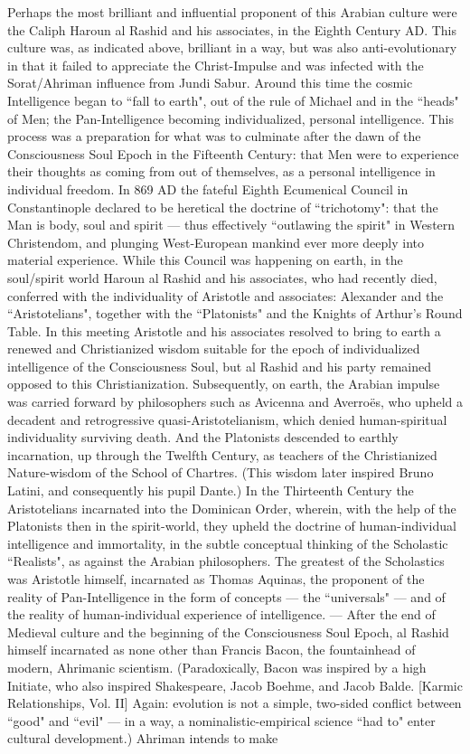 \begin{quotex}
Perhaps the most brilliant and influential proponent of this Arabian culture were the Caliph Haroun al Rashid and his associates, in the Eighth Century AD. This culture was, as indicated above, brilliant in a way, but was also anti-evolutionary in that it failed to appreciate the Christ-Impulse and was infected with the Sorat/Ahriman influence from Jundi Sabur. Around this time the cosmic Intelligence began to ``fall to earth", out of the rule of Michael and in the ``heads" of Men; the Pan-Intelligence becoming individualized, personal intelligence. This process was a preparation for what was to culminate after the dawn of the Consciousness Soul Epoch in the Fifteenth Century: that Men were to experience their thoughts as coming from out of themselves, as a personal intelligence in individual freedom. In 869 AD the fateful Eighth Ecumenical Council in Constantinople declared to be heretical the doctrine of ``trichotomy": that the Man is body, soul and spirit — thus effectively ``outlawing the spirit" in Western Christendom, and plunging West-European mankind ever more deeply into material experience. While this Council was happening on earth, in the soul/spirit world Haroun al Rashid and his associates, who had recently died, conferred with the individuality of Aristotle and associates: Alexander and the ``Aristotelians", together with the ``Platonists" and the Knights of Arthur's Round Table. In this meeting Aristotle and his associates resolved to bring to earth a renewed and Christianized wisdom suitable for the epoch of individualized intelligence of the Consciousness Soul, but al Rashid and his party remained opposed to this Christianization. Subsequently, on earth, the Arabian impulse was carried forward by philosophers such as Avicenna and Averroës, who upheld a decadent and retrogressive quasi-Aristotelianism, which denied human-spiritual individuality surviving death. And the Platonists descended to earthly incarnation, up through the Twelfth Century, as teachers of the Christianized Nature-wisdom of the School of Chartres. (This wisdom later inspired Bruno Latini, and consequently his pupil Dante.) In the Thirteenth Century the Aristotelians incarnated into the Dominican Order, wherein, with the help of the Platonists then in the spirit-world, they upheld the doctrine of human-individual intelligence and immortality, in the subtle conceptual thinking of the Scholastic ``Realists", as against the Arabian philosophers. The greatest of the Scholastics was Aristotle himself, incarnated as Thomas Aquinas, the proponent of the reality of Pan-Intelligence in the form of concepts — the ``universals" — and of the reality of human-individual experience of intelligence. — After the end of Medieval culture and the beginning of the Consciousness Soul Epoch, al Rashid himself incarnated as none other than Francis Bacon, the fountainhead of modern, Ahrimanic scientism. (Paradoxically, Bacon was inspired by a high Initiate, who also inspired Shakespeare, Jacob Boehme, and Jacob Balde. [Karmic Relationships, Vol. II] Again: evolution is not a simple, two-sided conflict between ``good" and ``evil" — in a way, a nominalistic-empirical science ``had to" enter cultural development.) Ahriman intends to make 
\end{quotex}
